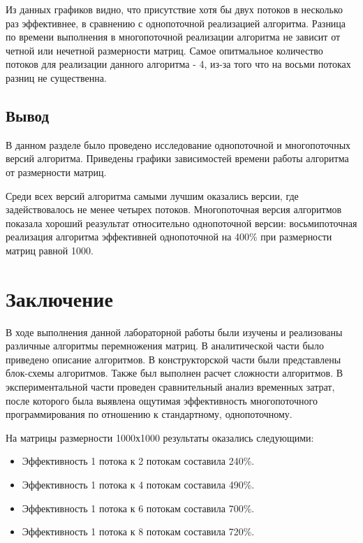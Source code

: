 \documentclass[12pt, a4paper]{report}
\begin{document}
	Из данных графиков видно, что присутствие хотя бы двух потоков в несколько раз эффективнее, в сравнению с однопоточной реализацией алгоритма. Разница по времени выполнения в многопоточной реализации алгоритма не зависит от четной или нечетной размерности матриц. Самое опитмальное количество потоков для реализации данного алгоритма - 4, из-за того что на восьми потоках разниц не существенна. 
	\newpage
	
	\section{Вывод}
	
	\hspace{0.6cm}В данном разделе было проведено исследование однопоточной и многопоточных версий алгоритма. Приведены графики зависимостей времени работы алгоритма от размерности матриц.
	
	\vspace{0.3cm}Среди всех версий алгоритма самыми лучшим оказались версии, где задействовалось не менее четырех потоков. Многопоточная версия алгоритмов показала хороший реазультат относительно однопоточной версии: восьмипоточная реализация алгоритма эффективней однопоточной на 400\% при размерности матриц равной 1000.

	\newpage

	\chapter{Заключение}
		\vspace{-0.6cm}\hspace{0.5cm}В ходе выполнения данной лабораторной работы были изучены и реализованы различные алгоритмы перемножения матриц. В аналитической части было приведено описание алгоритмов. В конструкторской части были представлены блок-схемы алгоритмов. Также был выполнен расчет сложности алгоритмов. В экспериментальной части проведен сравнительный анализ временных затрат, после которого была выявлена ощутимая эффективность многопоточного программирования по отношению к стандартному, однопоточному. 
		
		\vspace{0.3cm}На матрицы размерности 1000х1000 результаты оказались следующими:
	\begin{itemize} 
		\item Эффективность 1 потока к 2 потокам составила 240\%.
		\item Эффективность 1 потока к 4 потокам составила 490\%.
		\item Эффективность 1 потока к 6 потокам составила 700\%.
		\item Эффективность 1 потока к 8 потокам составила 720\%.
	\end{itemize}
	
\end{document}

